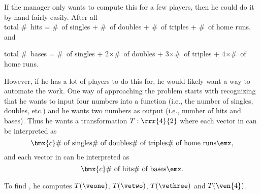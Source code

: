 {If the manager only wants to compute this for a few players, then he could do it by hand fairly easily. After all \\


\noindent total \#\ hits = \#\ of singles + \#\ of doubles + \#\ of triples + \#\ of home runs.\\

and \\

\begin{adjustwidth}{0pt}{-40pt}
\noindent total \#\ bases = \#\ of singles + 2$\times$\#\ of doubles + 3$\times$\#\ of triples + 4$\times$\#\ of home runs.\\
\end{adjustwidth}

However, if he has a lot of players to do this for, he would likely want a way to automate the work.  One way of approaching the problem starts with recognizing that he wants to input four numbers into a function (i.e., the number of singles, doubles, etc.) and he wants two numbers as output (i.e., number of hits and bases). Thus he wants a transformation $T:\rrr{4}{2}$ where each vector in  can be interpreted as $$\bmx{c} \text{\#\ of singles} \\\text{\#\ of doubles} \\ \text{\#\ of triples} \\ \text{\#\ of home runs} \emx,$$ and each vector in  can be interpreted as $$\bmx{c} \text{\#\ of hits} \\\text{\#\ of bases} \emx.$$


To find \TT, he computes $T(\veone)$, $T(\vetwo)$, $T(\vethree)$ and $T(\ven{4})$.\\

}
